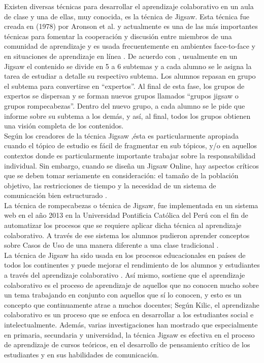 Existen diversas técnicas para desarrollar el aprendizaje colaborativo en un aula de clase y una de ellas, muy conocida, es la técnica de Jigsaw. Esta técnica fue creada en (1978) por Aronson et al. y actualmente es una de las más importantes técnicas para fomentar la cooperación y discusión entre miembros de una comunidad de aprendizaje y es usada frecuentemente en ambientes face-to-face y en situaciones de aprendizaje en línea \cite{blocher_increasing_2005}. De acuerdo con \cite{aronson_jigsaw_1978}, usualmente en un Jigsaw el contenido se divide en 5 a 6 subtemas y a cada alumno se le asigna la tarea de estudiar a detalle su respectivo subtema. Los alumnos repasan en grupo el subtema para convertirse en “expertos”. Al final de esta fase, los grupos de expertos se dispersan y se forman nuevos grupos llamados “grupos jigsaw o grupos rompecabezas”. Dentro del nuevo grupo, a cada alumno se le pide que informe sobre su subtema a los demás, y así, al final, todos los grupos obtienen una visión completa de los contenidos.\\

Según los creadores de la técnica Jigsaw \cite{aronson_jigsaw_1978} ,ésta es particularmente apropiada cuando el tópico de estudio es fácil de fragmentar en sub tópicos, y/o en aquellos contextos donde es particularmente importante trabajar sobre la responsabilidad individual. Sin embargo, cuando se diseña un Jigsaw Online, hay aspectos críticos que se deben tomar seriamente en consideración: el tamaño de la población objetivo, las restricciones de tiempo y la necesidad de un sistema de comunicación bien estructurado \cite{persico_pozzi_sarti_2008}.\\

La técnica de rompecabezas o técnica de Jigsaw, fue implementada en un sistema web en el año 2013 en la Universidad Pontificia Católica del Perú con el fin de automatizar los procesos que se requiere aplicar dicha técnica al aprendizaje colaborativo. A través de ese sistema los alumnos pudieron aprender conceptos sobre Casos de Uso de una manera diferente a una clase tradicional \cite{pinzas_desarrollo_2013}.\\

La técnica de Jigsaw ha sido usada en los procesos educacionales en países de todos los continentes y puede mejorar el rendimiento de los alumnos y estudiantes a través del aprendizaje colaborativo  \cite{maftei_strengthen_2011}. Así mismo, \cite{kilic_the_ffect_2008} sostiene que el aprendizaje colaborativo es el proceso de aprendizaje de aquellos que no conocen mucho sobre un tema trabajando en conjunto con aquellos que sí lo conocen, y esto es un concepto que continuamente atrae a muchos docentes; Según Kilic, el aprendizahe colaborativo es un proceso que se enfoca en desarrollar a los estudiantes social e intelectualmente. Además, varias investigaciones han mostrado que especialmente en primaria, secundaria y universidad, la técnica Jigsaw es efectiva en el proceso de aprendizaje de cursos teóricos, en el desarrollo de pensamiento crítico de los estudiantes y en sus habilidades de comunicación.\\

